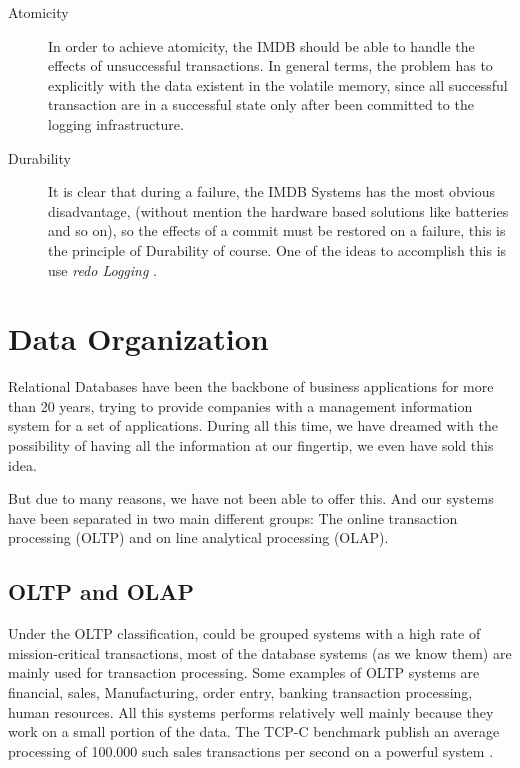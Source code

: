 \documentclass[10pt]{article} %
\begin{document}
\begin{description}
  \item[Atomicity] In order to achieve atomicity, the IMDB should be able to handle the effects of unsuccessful transactions. In general terms, the problem has to explicitly with the data existent in the volatile memory, since all successful transaction are in a successful state only after been committed to the logging infrastructure. %
  \item[Durability] It is clear that during a failure, the IMDB Systems has the most obvious disadvantage, (without mention the hardware based solutions like batteries and so on), so the effects of a commit must be restored on a failure, this is the principle of Durability of course. One of the ideas to accomplish this is use \emph{ redo Logging }. %
\end{description}


\section{Data Organization}

Relational Databases have been the backbone of business applications for more    than 20 years, trying to provide companies with a management information system for a set of applications. During all this time, we have dreamed with the possibility of having all the information at our fingertip, we even have sold this idea\cite{Plattner}.

    But due to many reasons, we have not been able to offer this. And our systems have been separated in two main different groups: The online transaction processing (OLTP) and on line analytical processing (OLAP).

\subsection{OLTP and OLAP}
    Under the OLTP classification, could be grouped systems with a high rate of mission-critical transactions, most of the database systems (as we know them) are mainly used for transaction processing. Some examples of OLTP systems are financial, sales, Manufacturing, order entry, banking transaction processing, human resources. All this systems performs relatively well mainly because they work on a small portion of the data. The TCP-C benchmark publish an average processing of 100.000 such sales transactions per second on a powerful system \cite{Kemper}.
    
\end{document}

